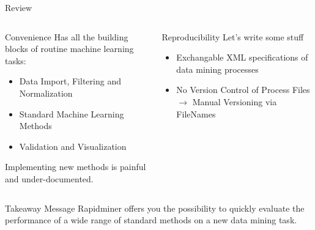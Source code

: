 \documentclass[aspectratio=169,10pt]{beamer}
\begin{document}
\begin{frame}[t,fragile]{Review}

    \begin{columns}[t]
    \begin{column}{0.5\textwidth}
    \begin{block}{Convenience}
        Has all the building blocks of routine machine learning tasks:
        \begin{itemize}
            \item Data Import, Filtering and Normalization
            \item Standard Machine Learning Methods
            \item Validation and Visualization
        \end{itemize}
        Implementing new methods is painful and under-documented.
    \end{block}
    \end{column}
    \begin{column}{0.5\textwidth}
    \begin{block}{Reproducibility}
        Let's write some stuff
        \begin{itemize}
        \item Exchangable XML specifications of data mining processes
        \item No Version Control of Process Files $\rightarrow$ Manual Versioning via FileNames
        \end{itemize}
    \end{block}
    
    \end{column}
    \end{columns}
    \hfill
    \begin{alertblock}{Takeaway Message}
        Rapidminer offers you the possibility to quickly evaluate the performance of a wide range of standard methods on a new data mining task.
    \end{alertblock}
\end{frame}

\end{document}

